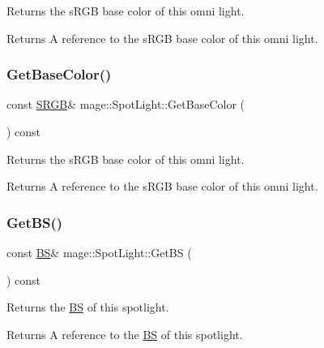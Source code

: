 Returns the s\+R\+GB base color of this omni light.

\begin{DoxyReturn}{Returns}
A reference to the s\+R\+GB base color of this omni light. 
\end{DoxyReturn}
\hypertarget{classmage_1_1_spot_light_afe96354e78abccea8fd5a4745728f5f3}{}\label{classmage_1_1_spot_light_afe96354e78abccea8fd5a4745728f5f3} 
\subsubsection{\texorpdfstring{Get\+Base\+Color()}{GetBaseColor()}\hspace{0.1cm}{\footnotesize\ttfamily [2/2]}}
{\footnotesize\ttfamily const \hyperlink{structmage_1_1_s_r_g_b}{S\+R\+GB}\& mage\+::\+Spot\+Light\+::\+Get\+Base\+Color (\begin{DoxyParamCaption}{ }\end{DoxyParamCaption}) const\hspace{0.3cm}{\ttfamily [noexcept]}}

Returns the s\+R\+GB base color of this omni light.

\begin{DoxyReturn}{Returns}
A reference to the s\+R\+GB base color of this omni light. 
\end{DoxyReturn}
\hypertarget{classmage_1_1_spot_light_acd80a0f565e74650c97f1680938ae997}{}\label{classmage_1_1_spot_light_acd80a0f565e74650c97f1680938ae997} 
\subsubsection{\texorpdfstring{Get\+B\+S()}{GetBS()}}
{\footnotesize\ttfamily const \hyperlink{classmage_1_1_b_s}{BS}\& mage\+::\+Spot\+Light\+::\+Get\+BS (\begin{DoxyParamCaption}{ }\end{DoxyParamCaption}) const\hspace{0.3cm}{\ttfamily [noexcept]}}

Returns the \hyperlink{classmage_1_1_b_s}{BS} of this spotlight.

\begin{DoxyReturn}{Returns}
A reference to the \hyperlink{classmage_1_1_b_s}{BS} of this spotlight. 
\end{DoxyReturn}
\hypertarget{classmage_1_1_spot_light_ad9c4cabf950619605a8040e41b9acb5b}{}\label{classmage_1_1_spot_light_ad9c4cabf950619605a8040e41b9acb5b} 
